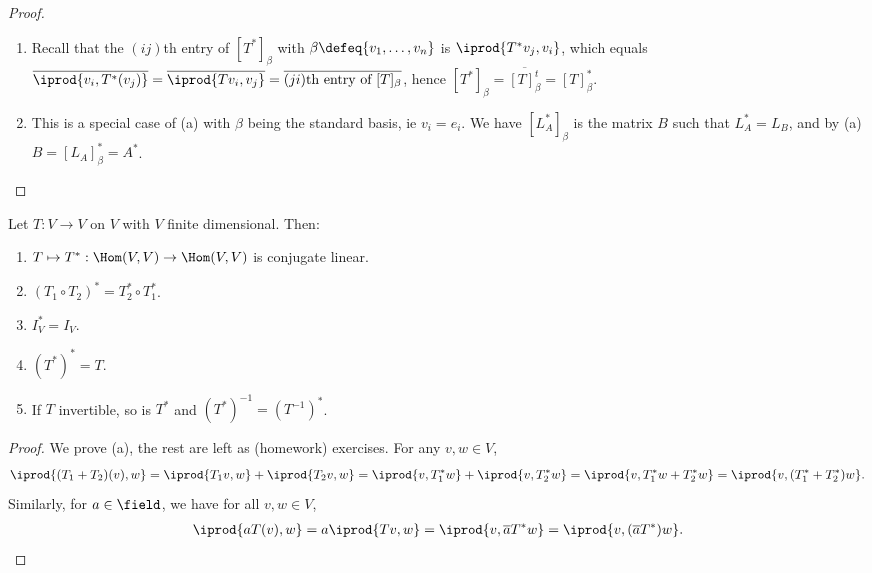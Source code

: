 \begin{proof}
    \begin{enumerate}[label=(\alph*)]
        \item Recall that the $(ij)$th entry of $[T^\ast]_\beta$ with $\beta \defeq \{v_1, \dots, v_n\}$ is $\iprod{T^\ast v_j, v_i}$, which equals $\overline{\iprod{v_i, T^\ast(v_j)}} = \overline{\iprod{Tv_i, v_j}} = \overline{(ji)\text{th entry of $[T]_\beta$}}$, hence $[T^\ast]_\beta = \overline{[T]_\beta^t} = [T]_\beta^\ast$.

        \item This is a special case of (a) with $\beta$ being the standard basis, ie $v_i = e_i$. We have $[L_A^\ast]_\beta$ is the matrix $B$ such that $L_A^\ast = L_B$, and by (a) $B = [L_A]_\beta^\ast = A^\ast$.
    \end{enumerate}
\end{proof}

\begin{proposition}
    Let $T : V \to V$ on $V$ with $V$ finite dimensional. Then: \begin{enumerate}[label=(\alph*)]
        \item $T \mapsto T^\ast : \Hom(V, V) \to \Hom(V, V)$ is conjugate linear.
        \item $(T_1 \circ T_2)^\ast = T_2^\ast \circ T_1^\ast$.
        \item $I_V^\ast = I_V$.
        \item $(T^\ast)^\ast = T$.
        \item If $T$ invertible, so is $T^\ast$ and $(T^\ast)^{-1} = (T^{-1})^\ast$.
    \end{enumerate}
\end{proposition}

\begin{proof}
    We prove (a), the rest are left as (homework) exercises. For any $v, w \in V$, \begin{align*}
        \iprod{(T_1 + T_2)(v), w} = \iprod{T_1 v, w} + \iprod{T_2 v, w} = \iprod{v, T_1^\ast w} + \iprod{v, T_2^\ast w} = \iprod{v, T_1^\ast w + T_2^\ast w} = \iprod{v, (T_1^\ast + T_2^\ast)w}.
    \end{align*}
    Similarly, for $a \in \field$, we have for all $v, w \in V$, \begin{align*}
        \iprod{aT(v), w} = a \iprod{Tv, w} = \iprod{v, \overline{a} T^\ast w} = \iprod{v, (\overline{a}T^\ast) w}.
    \end{align*}
\end{proof}

